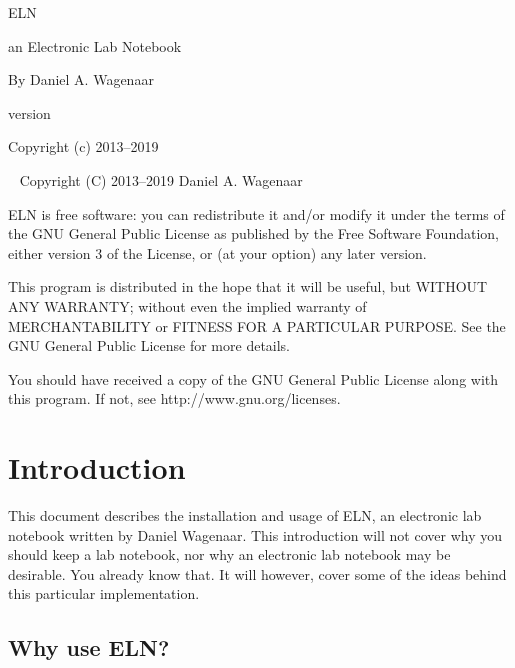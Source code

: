 \documentclass[11pt]{report}
\begin{document}
\thispagestyle{empty}
\begin{centering}
  {\Huge ELN}
  \vskip30pt

  {\Large an Electronic Lab Notebook}
  \vskip60pt

 
  {\large By Daniel A. Wagenaar}
  \vfill  

{\large version {}} 
\vskip10pt
  
  
  {Copyright (c) 2013--2019}
  
\end{centering}
\pagebreak
~
\vfill
\noindent Copyright (C) 2013--2019 Daniel A. Wagenaar\medskip

ELN is free software: you can redistribute it and/or modify
it under the terms of the GNU General Public License as published by
the Free Software Foundation, either version 3 of the License, or
(at your option) any later version.

This program is distributed in the hope that it will be useful,
but WITHOUT ANY WARRANTY; without even the implied warranty of
MERCHANTABILITY or FITNESS FOR A PARTICULAR PURPOSE.  See the
GNU General Public License for more details.

You should have received a copy of the GNU General Public License
along with this program.  If not, see http://www.gnu.org/licenses.
\pagebreak

\chapter{Introduction}

This document describes the installation and usage of ELN, an
electronic lab notebook written by Daniel Wagenaar.  This introduction
will not cover why you should keep a lab notebook, nor why an
electronic lab notebook may be desirable. You already know that.  It
will however, cover some of the ideas behind this particular
implementation.

\section{Why use ELN?}
\end{document}
